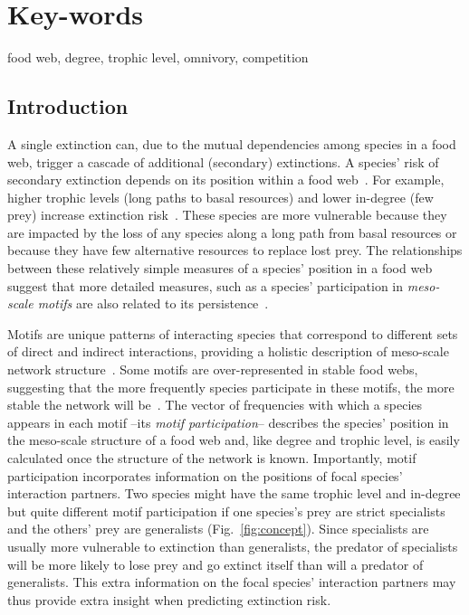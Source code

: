 \documentclass[12pt]{article}
\begin{document}
\section*{Key-words}
    food web, degree, trophic level, omnivory, competition

\clearpage
\begin{spacing}{1.0}

\section*{Introduction} 

    A single extinction can, due to the mutual dependencies among species in a food web,  trigger a cascade of additional (secondary) extinctions. 
    A species' risk of secondary extinction depends on its position within a food web~\citep{Santos2021,dunne2009cascading, Eklof2006}.
    For example, higher trophic levels (long paths to basal resources) and lower in-degree (few prey) increase extinction risk~\citep{Allesina2012,binzer2011susceptibility,Eklof2006}.
    These species are more vulnerable because they are impacted by the loss of any species along a long path from basal resources or because they have few alternative resources to replace lost prey.
    The relationships between these relatively simple measures of a species' position in a food web suggest that more detailed measures, such as a species' participation in \emph{meso-scale motifs} are also related to its persistence~\citep{Cirtwill2022Oikos}.
    
    
    Motifs are unique patterns of interacting species that correspond to different sets of direct and indirect interactions, providing a holistic description of meso-scale network structure~\citep{Stouffer2007,Stouffer2012}.
    Some motifs are over-represented in stable food webs, suggesting that the more frequently species participate in these motifs, the more stable the network will be~\citep{Borrelli2015a}. 
    The vector of frequencies with which a species appears in each motif --its \emph{motif participation}-- describes the species' position in the meso-scale structure of a food web and, like degree and trophic level, is easily calculated once the structure of the network is known.
    Importantly, motif participation incorporates information on the positions of focal species' interaction partners.
    Two species might have the same trophic level and in-degree but quite different motif participation if one species's prey are strict specialists and the others' prey are generalists (Fig.~\ref{fig:concept}).
    Since specialists are usually more vulnerable to extinction than generalists, the predator of specialists will be more likely to lose prey and go extinct itself than will a predator of generalists.
    This extra information on the focal species' interaction partners may thus provide extra insight when predicting extinction risk.
    


\end{spacing}
\end{document}

